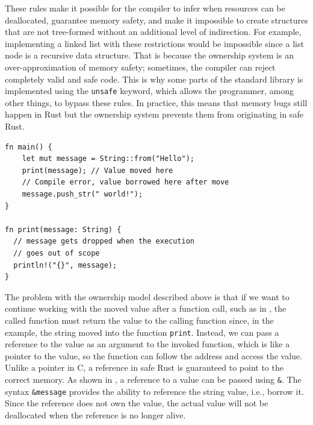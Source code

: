 \documentclass[paper=a4,%
  twoside,%
  BCOR4mm,%
  abstract=true,%
  toc=bibliography,%
  chapterprefix=true,%
  toc=bibliographynumbered,%
  open=right,%
  english,%
  pagesize=pdftex]{scrreprt}
\begin{document}
These rules make it possible for the compiler to infer when resources can be deallocated, guarantee memory safety, and make it impossible to create structures that are not tree-formed without an additional level of indirection. For example, implementing a linked list with these restrictions would be impossible since a list node is a recursive data structure. That is because the ownership system is an over-approximation of memory safety; sometimes, the compiler can reject completely valid and safe code. This is why some parts of the standard library is implemented using the \texttt{unsafe} keyword, which allows the programmer, among other things, to bypass these rules. In practice, this means that memory bugs still happen in Rust but the ownership system prevents them from originating in safe Rust.

\begin{lstlisting}[style=boxed, caption={Transferring the ownership to a method}, label=lst:ownership-method-call]
fn main() {
    let mut message = String::from("Hello");
    print(message); // Value moved here
    // Compile error, value borrowed here after move
    message.push_str(" world!");
}

fn print(message: String) {
  // message gets dropped when the execution
  // goes out of scope
  println!("{}", message);
}
\end{lstlisting}

The problem with the ownership model described above is that if we want to continue working with the moved value after a function call, such as in , the called function must return the value to the calling function since, in the example, the string moved into the function \texttt{print}. Instead, we can pass a reference to the value as an argument to the invoked function, which is like a pointer to the value, so the function can follow the address and access the value. Unlike a pointer in C, a reference in safe Rust is guaranteed to point to the correct memory. As shown in , a reference to a value can be passed using \texttt{\string&}. The syntax \texttt{\string&message} provides the ability to reference the string value, i.e., borrow it. Since the reference does not own the value, the actual value will not be deallocated when the reference is no longer alive.
\end{document}
